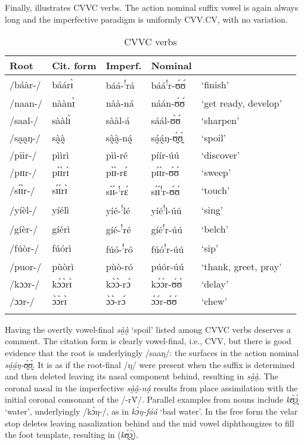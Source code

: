 \documentclass[output=paper
,newtxmath
,modfonts
,nonflat]{langsci/langscibook}
\begin{document}
     Finally,  illustrates CVVC verbs. The action nominal suffix vowel is again always long and the imperfective paradigm is uniformly CVV.CV, with no variation.

\begin{table}
\begin{tabularx}{\textwidth}{llXXXX}
\lsptoprule
 {Root} & {Cit. form} & {Imperf.} & {Nominal} & \\
\midrule
/báàr-/&	báárɪ̀&	báá-\textsuperscript{!}rá&	báá\textsuperscript{!}r-ʊ́ʊ́&	‘finish’\\
/naan-/&	nàànɪ̀&	nàà-ná	&	náán-ʊ́ʊ́&	‘get ready, develop’\\
/saal-/&	sààlɪ̀&	sààl-á&	sáál-ʊ́ʊ́ &	‘sharpen’\\
/sa̰a̰ŋ-/&	sà̰à̰&	sà̰à̰-ná̰&	sá̰á̰ŋ-ʊ̰́ʊ̰́&	‘spoil’\\
/piir-/&	pììrì&	pìì-ré&	píír-úú&	‘discover’\\
/pɪɪr-/&	pɪ̀ɪ̀rɪ̀&	pɪ̀ɪ̀-rɛ́&	pɪ́ɪ́r-ʊ́ʊ́&	‘sweep’\\
/sɪ́ɪ̀r-/&	sɪ́ɪ́rɪ̀&	sɪ́ɪ́-\textsuperscript{!}rɛ́&	sɪ́ɪ́\textsuperscript{!}r-ʊ́ʊ́&	‘touch’\\
/yíèl-/&	yíélì&	yíé-\textsuperscript{!}lé&	yíé\textsuperscript{!}l-úú&	‘sing’\\
/gíèr-/&	gíérì&	gíé-\textsuperscript{!}ré&	gíé\textsuperscript{!}r-úú&	‘belch’\\
/fúòr-/&	fúórì&	fúó-\textsuperscript{!}ró&	fúó\textsuperscript{!}r-úú&	‘sip’\\
/puor-/&	pùòrì&	pùò-ró	&	púór-úú&	‘thank, greet, pray’\\
/kɔɔr-/&	kɔ̀ɔ̀rɪ̀&	kɔ̀ɔ̀-rɔ́&	kɔ́ɔ́r-ʊ́ʊ́&	‘delay’\\
/ɔɔr-/&	ɔ̀ɔ̀rɪ̀&	ɔ̀ɔ̀-rɔ́&	ɔ́ɔ́r-ʊ́ʊ́&	‘chew’\\
\lspbottomrule
\end{tabularx}
\caption{CVVC verbs}
\label{tab:anttila:11}
\end{table}


Having the overtly vowel-final \textit{sà̰à̰} ‘spoil’ listed among CVVC verbs deserves a comment. The citation form is clearly vowel-final, i.e., CVV, but there is good evidence that the root is underlyingly /saaŋ/: the  surfaces in the action nominal \textit{sá̰á̰ŋ-ʊ̰́ʊ̰́}. It is as if the root-final /ŋ/ were present when the suffix  is determined and then deleted leaving its nasal component behind, resulting in \textit{sà̰à̰}. The coronal nasal in the imperfective \textit{sà̰à̰-ná̰} results from place assimilation with the initial coronal consonant of the  /-r\'{V}/. Parallel examples from nouns include \textit{kʊ̰̀ɔ̰́} ‘water’, underlyingly /kɔ̀ŋ-/, as in \textit{kɔ̀ŋ-fáá} ‘bad water’. In the free form the velar stop deletes leaving nasalization behind and the mid vowel diphthongizes to fill the foot template, resulting in (\textit{kʊ̰̀ɔ̰́}).
\end{document}
